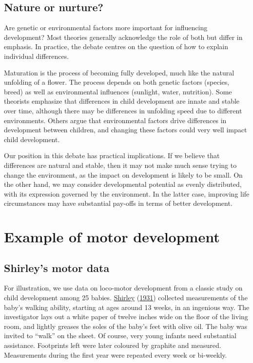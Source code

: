 \documentclass[
]{book}
\begin{document}
\hypertarget{nature-or-nurture}{%
\subsection{Nature or nurture?}\label{nature-or-nurture}}

Are genetic or environmental factors more important for influencing development? Most theories generally acknowledge the role of both but differ in emphasis. In practice, the debate centres on the question of how to explain individual differences.

Maturation is the process of becoming fully developed, much like the natural unfolding of a flower. The process depends on both genetic factors (species, breed) as well as environmental influences (sunlight, water, nutrition). Some theorists emphasize that differences in child development are innate and stable over time, although there may be differences in unfolding speed due to different environments. Others argue that environmental factors drive differences in development between children, and changing these factors could very well impact child development.

Our position in this debate has practical implications. If we believe that differences are natural and stable, then it may not make much sense trying to change the environment, as the impact on development is likely to be small. On the other hand, we may consider developmental potential as evenly distributed, with its expression governed by the environment. In the latter case, improving life circumstances may have substantial pay-offs in terms of better development.

\hypertarget{sec:motorexample}{%
\section{Example of motor development}\label{sec:motorexample}}

\hypertarget{shirleys-motor-data}{%
\subsection{Shirley's motor data}\label{shirleys-motor-data}}

For illustration, we use data on loco-motor development from a classic study on child development among 25 babies. \protect\hyperlink{ref-shirley1931}{Shirley} (\protect\hyperlink{ref-shirley1931}{1931}) collected measurements of the baby's walking ability, starting at ages around 13 weeks, in an ingenious way. The investigator lays out a white paper of twelve inches wide on the floor of the living room, and lightly greases the soles of the baby's feet with olive oil. The baby was invited to ``walk'' on the sheet. Of course, very young infants need substantial assistance. Footprints left were later coloured by graphite and measured. Measurements during the first year were repeated every week or bi-weekly.
\end{document}
